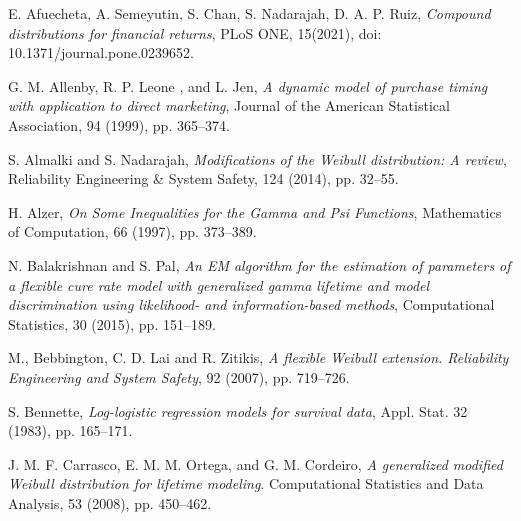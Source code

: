 \documentclass{ps}
\theoremstyle{plain}%
\theoremstyle{definition}
\theoremstyle{remark}
\begin{document}



\begin{thebibliography}{}
	
	E. Afuecheta, A. Semeyutin, S. Chan, S. Nadarajah, D. A. P. Ruiz, \emph{Compound distributions for financial returns}, PLoS ONE, 15(2021), doi: 10.1371/journal.pone.0239652.
	
	G. M. Allenby, R. P. Leone , and L. Jen,  \emph{A dynamic model of purchase timing with application to direct marketing}, Journal of the American Statistical Association, 94 (1999), pp. 365--374.
	
	S. Almalki  and S. Nadarajah,  \emph{Modifications of the Weibull distribution: A review}, Reliability Engineering \& System Safety, 124 (2014), pp. 32--55.
	
	H. Alzer, \emph{On Some Inequalities for the Gamma and Psi Functions}, Mathematics of Computation,  66 (1997), pp. 373--389.
	
	N. Balakrishnan and S. Pal,  \emph{An EM algorithm for the estimation of parameters of a flexible cure rate model with generalized gamma lifetime and model discrimination using likelihood- and information-based methods}, Computational Statistics, 30 (2015),  pp. 151--189.
	
	M., Bebbington, C. D. Lai and  R. Zitikis,  \emph{A flexible Weibull extension. Reliability Engineering and System Safety}, 92 (2007),  pp. 719--726.
	
	S. Bennette,  \emph{Log-logistic regression models for survival data}, Appl. Stat. 32 (1983), pp. 165--171.
	
	J. M. F. Carrasco,   E. M. M.  Ortega, and G. M. Cordeiro,  \emph{A generalized modified Weibull distribution for lifetime modeling}. Computational Statistics and Data Analysis, 53 (2008),  pp. 450--462.
	

\end{thebibliography}
\end{document}
